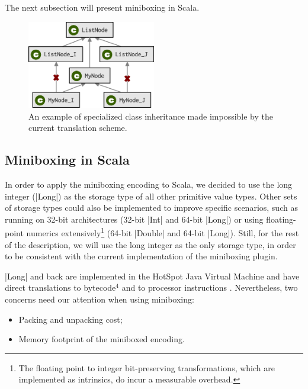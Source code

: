 The next subsection will present miniboxing in Scala.

\begin{figure}[t!]
    \centering
    \includegraphics[width=0.50\textwidth]{diags/spec-multi.eps}

    \caption{An example of specialized class inheritance made impossible by the current translation scheme.}
    \label{mbox:fig-spec-multi}

\end{figure}

\subsection{Miniboxing in Scala}

In order to apply the miniboxing encoding to Scala, we decided to use the long integer (|Long|) as the storage type of all other primitive value types. Other sets of storage types could also be implemented to improve specific scenarios, such as running on 32-bit architectures (32-bit |Int| and 64-bit |Long|) or using floating-point numerics extensively\footnote{The floating point to integer bit-preserving transformations, which are implemented as intrinsics, do incur a measurable overhead.} (64-bit |Double| and 64-bit |Long|). Still, for the rest of the description, we will use the long integer as the only storage type, in order to be consistent with the current implementation of the miniboxing plugin.

 |Long| and back are implemented in the HotSpot Java Virtual Machine and have direct translations to bytecode$^\text{4}$ and to processor instructions \cite{intel-ia-32-instruction-reference}. Nevertheless, two concerns need our attention when using miniboxing: %
\begin{itemize}
\item Packing and unpacking cost;
\item Memory footprint of the miniboxed encoding.
\end{itemize}

